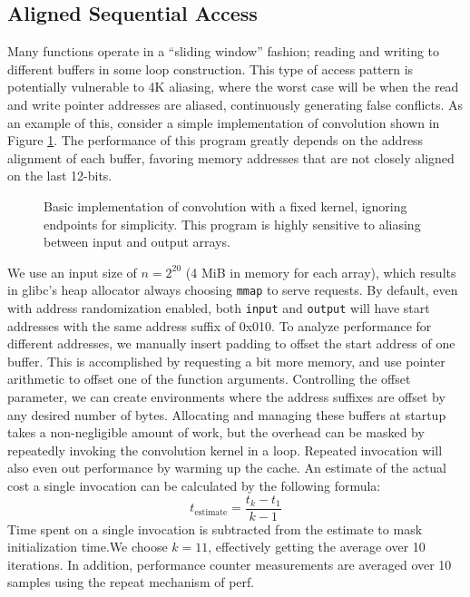 \documentclass[10pt, conference, compsocconf]{IEEEtran}
\begin{document}
\subsection{Aligned Sequential Access}
Many functions operate in a ``sliding window'' fashion; reading and writing to different buffers in some loop construction.
This type of access pattern is potentially vulnerable to 4K aliasing, where the worst case will be when the read and write pointer addresses are aliased, continuously generating false conflicts.
As an example of this, consider a simple implementation of convolution shown in Figure \ref{lst:conv}.
The performance of this program greatly depends on the address alignment of each buffer, favoring memory addresses that are not closely aligned on the last 12-bits.

\begin{figure}[t]
  \centering
  
  \caption{Basic implementation of convolution with a fixed kernel, ignoring endpoints for simplicity. This program is highly sensitive to aliasing between input and output arrays.}
  \label{lst:conv}
\end{figure}

We use an input size of $n=2^{20}$ (4 MiB in memory for each array), which results in glibc's heap allocator always choosing \texttt{mmap} to serve requests.
By default, even with address randomization enabled, both \texttt{input} and \texttt{output} will have start addresses with the same address suffix of 0x010.
To analyze performance for different addresses, we manually insert padding to offset the start address of one buffer.
This is accomplished by requesting a bit more memory, and use pointer arithmetic to offset one of the function arguments.
Controlling the offset parameter, we can create environments where the address suffixes are offset by any desired number of bytes.
Allocating and managing these buffers at startup takes a non-negligible amount of work, but the overhead can be masked by repeatedly invoking the convolution kernel in a loop.
Repeated invocation will also even out performance by warming up the cache.
An estimate of the actual cost a single invocation can be calculated by the following formula:
\[
t_{\text{estimate}} = \frac{t_{k} - t_{1}}{k - 1}
\]
Time spent on a single invocation is subtracted from the estimate to mask initialization time.We choose $k=11$, effectively getting the average over 10 iterations.
In addition, performance counter measurements are averaged over 10 samples using the repeat mechanism of perf.
\end{document}
